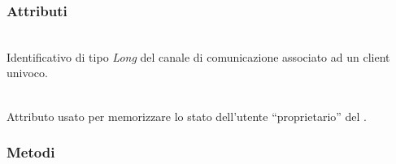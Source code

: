 \subsubsection*{Attributi}
\begin{description}
  \item{}\\
  Identificativo di tipo \textit{Long} del canale di comunicazione associato ad un client univoco.
  \item{}\\
  Attributo usato per memorizzare lo stato dell'utente ``proprietario'' del .
\end{description}


\subsubsection*{Metodi}
